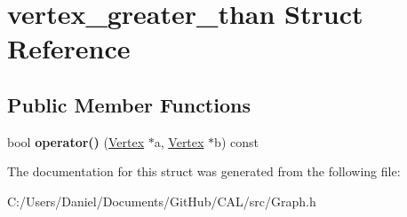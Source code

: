 \hypertarget{structvertex__greater__than}{}\section{vertex\+\_\+greater\+\_\+than Struct Reference}
\label{structvertex__greater__than}
\subsection*{Public Member Functions}
\begin{DoxyCompactItemize}
\item 
\hypertarget{structvertex__greater__than_abb4efa3c80a53f036caa33ffb22bfa9f}{}\label{structvertex__greater__than_abb4efa3c80a53f036caa33ffb22bfa9f} 
bool {\bfseries operator()} (\hyperlink{class_vertex}{Vertex} $\ast$a, \hyperlink{class_vertex}{Vertex} $\ast$b) const
\end{DoxyCompactItemize}


The documentation for this struct was generated from the following file\+:\begin{DoxyCompactItemize}
\item 
C\+:/\+Users/\+Daniel/\+Documents/\+Git\+Hub/\+C\+A\+L/src/Graph.\+h\end{DoxyCompactItemize}
